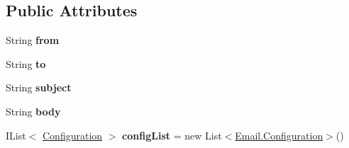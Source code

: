 \subsection*{Public Attributes}
\begin{DoxyCompactItemize}
\item 
\hypertarget{classcom_1_1shephertz_1_1app42_1_1paas_1_1sdk_1_1windows_1_1email_1_1_email_ab4f2eeba55c1ab22c86a0a02866f11ee}{String {\bfseries from}}\label{classcom_1_1shephertz_1_1app42_1_1paas_1_1sdk_1_1windows_1_1email_1_1_email_ab4f2eeba55c1ab22c86a0a02866f11ee}

\item 
\hypertarget{classcom_1_1shephertz_1_1app42_1_1paas_1_1sdk_1_1windows_1_1email_1_1_email_ade545a13f79f94e1b49c47680e87f24a}{String {\bfseries to}}\label{classcom_1_1shephertz_1_1app42_1_1paas_1_1sdk_1_1windows_1_1email_1_1_email_ade545a13f79f94e1b49c47680e87f24a}

\item 
\hypertarget{classcom_1_1shephertz_1_1app42_1_1paas_1_1sdk_1_1windows_1_1email_1_1_email_ab0845d0bd7a659a8a493e9d7cf4cb63b}{String {\bfseries subject}}\label{classcom_1_1shephertz_1_1app42_1_1paas_1_1sdk_1_1windows_1_1email_1_1_email_ab0845d0bd7a659a8a493e9d7cf4cb63b}

\item 
\hypertarget{classcom_1_1shephertz_1_1app42_1_1paas_1_1sdk_1_1windows_1_1email_1_1_email_af15fa53827883db309fd4f9f6daa3c67}{String {\bfseries body}}\label{classcom_1_1shephertz_1_1app42_1_1paas_1_1sdk_1_1windows_1_1email_1_1_email_af15fa53827883db309fd4f9f6daa3c67}

\item 
\hypertarget{classcom_1_1shephertz_1_1app42_1_1paas_1_1sdk_1_1windows_1_1email_1_1_email_af8ab6ca05a061a20f2f7fe4ca30265f1}{I\+List$<$ \hyperlink{classcom_1_1shephertz_1_1app42_1_1paas_1_1sdk_1_1windows_1_1email_1_1_email_1_1_configuration}{Configuration} $>$ {\bfseries config\+List} = new List$<$\hyperlink{classcom_1_1shephertz_1_1app42_1_1paas_1_1sdk_1_1windows_1_1email_1_1_email_1_1_configuration}{Email.\+Configuration}$>$()}\label{classcom_1_1shephertz_1_1app42_1_1paas_1_1sdk_1_1windows_1_1email_1_1_email_af8ab6ca05a061a20f2f7fe4ca30265f1}

\end{DoxyCompactItemize}
